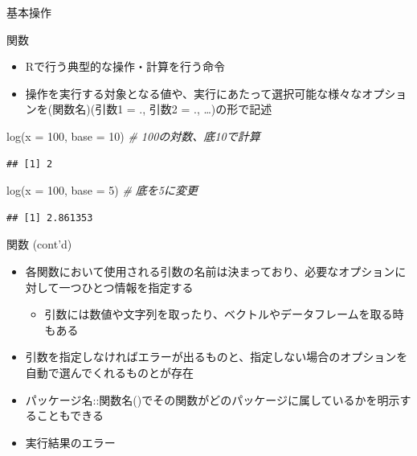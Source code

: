 \documentclass[
  ignorenonframetext,
]{beamer}
\newenvironment{Shaded}{\begin{snugshade}}{\end{snugshade}}
\newcommand{\AttributeTok}[1]{\textcolor[rgb]{0.77,0.63,0.00}{#1}}
\newcommand{\CommentTok}[1]{\textcolor[rgb]{0.56,0.35,0.01}{\textit{#1}}}
\newcommand{\DecValTok}[1]{\textcolor[rgb]{0.00,0.00,0.81}{#1}}
\newcommand{\FunctionTok}[1]{\textcolor[rgb]{0.00,0.00,0.00}{#1}}
\newcommand{\NormalTok}[1]{#1}
\providecommand{\tightlist}{%
  \setlength{\itemsep}{0pt}\setlength{\parskip}{0pt}}
\begin{document}
\begin{frame}[fragile]{基本操作}
\begin{block}{関数}
\protect\hypertarget{ux95a2ux6570}{}
\begin{itemize}
\tightlist
\item
  Rで行う典型的な操作・計算を行う命令
\item
  操作を実行する対象となる値や、実行にあたって選択可能な様々なオプションを(関数名)(引数1
  = ., 引数2 = ., \ldots)の形で記述
\end{itemize}

\begin{Shaded}
\begin{Highlighting}[]
\FunctionTok{log}\NormalTok{(}\AttributeTok{x =} \DecValTok{100}\NormalTok{, }\AttributeTok{base =} \DecValTok{10}\NormalTok{) }\CommentTok{\# 100の対数、底10で計算}
\end{Highlighting}
\end{Shaded}

\begin{verbatim}
## [1] 2
\end{verbatim}

\begin{Shaded}
\begin{Highlighting}[]
\FunctionTok{log}\NormalTok{(}\AttributeTok{x =} \DecValTok{100}\NormalTok{, }\AttributeTok{base =} \DecValTok{5}\NormalTok{) }\CommentTok{\# 底を5に変更}
\end{Highlighting}
\end{Shaded}

\begin{verbatim}
## [1] 2.861353
\end{verbatim}
\end{block}

\begin{block}{関数 (cont'd)}
\protect\hypertarget{ux95a2ux6570-contd}{}
\begin{itemize}
\tightlist
\item
  各関数において使用される引数の名前は決まっており、必要なオプションに対して一つひとつ情報を指定する

  \begin{itemize}
  \tightlist
  \item
    引数には数値や文字列を取ったり、ベクトルやデータフレームを取る時もある
  \end{itemize}
\item
  引数を指定しなければエラーが出るものと、指定しない場合のオプションを自動で選んでくれるものとが存在
\item
  パッケージ名::関数名()でその関数がどのパッケージに属しているかを明示することもできる
\item
  実行結果のエラー


\end{itemize}
\end{block}
\end{frame}
\end{document}
